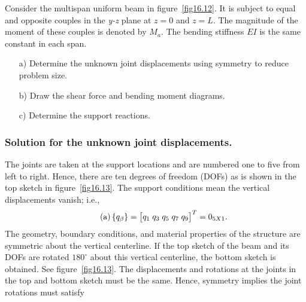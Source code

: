 \documentclass{AeroStructure-ERJohnson}
\begin{document}
\begin{example}\label{ex16.6}Consider the multispan uniform beam in figure~\ref{fig16.12}. It is subject to equal and opposite couples in the \textit{y-z} plane at $z = 0$ and $z = \textit{L}$. The magnitude of the moment of these couples is denoted by $M_{a}$. The bending stiffness $E I$ is the same constant in each span.
\begin{enumerate}
\item[a)] Determine the unknown joint displacements using symmetry to reduce problem size.

\item[b)] Draw the shear force and bending moment diagrams.

\item[c)] Determine the support reactions.
\end{enumerate}


\subsubsection{Solution for the unknown joint displacements.} The joints are taken at the support locations and are numbered one to five from left to right. Hence, there are ten degrees of freedom (DOFs) as is shown in the top sketch in figure~\ref{fig16.13}. The support conditions mean the vertical displacements vanish; i.e.,
\begin{align}\label{eq16.6a}\tag{a}
\left\{q_{\beta}\right\}=\left[\begin{array}{@{}l@{\;}l@{\;}l@{\;}l@{\;}l@{}}q_{1} & q_{3} & q_{5} & q_{7} & q_{9}\end{array}\right]^{T}=0_{5X1}.
\end{align}
The geometry, boundary conditions, and material properties of the structure are symmetric about the vertical centerline. If the top sketch of the beam and its DOFs are rotated $180^{\circ}$ about this vertical centerline, the bottom sketch is obtained. See figure~\ref{fig16.13}. The displacements and rotations at the joints in the top and bottom sketch must be the same. Hence, symmetry implies the joint rotations must satisfy


\end{example}
\end{document}
